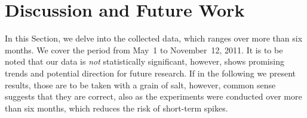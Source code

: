 \documentclass{iosart2c}
\begin{document}
\begin{table}
  \centering
  \qquad
  \caption{\hspace{-2.5em}}
  \label{tab:toplocations}
\end{table}

\section{Discussion and Future Work}
In this Section, we delve into the collected data, which ranges over more than six months.
We cover the period from May~1 to November~12, 2011.
It is to be noted that our data is \emph{not} statistically significant, however, shows promising trends and potential direction for future research.
If in the following we present results, those are to be taken with a grain of salt, however, common sense suggests that they are correct, also as the experiments were conducted over more than six months, which reduces the risk of short-term spikes.
\end{document}
